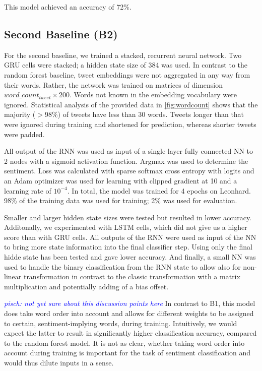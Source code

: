 \documentclass[10pt,conference,compsocconf]{IEEEtran}
\newcommand{\pisch}[1]{\textit{\textcolor{blue}{pisch: #1}}}
\begin{document}
This model achieved an accuracy of 72\%.

\subsection{Second Baseline (B2)} \label{b2}

For the second baseline, we trained a stacked, recurrent neural
network. Two GRU cells were stacked; a hidden state size of 384 was used.
In contrast to the random forest baseline, tweet embeddings
were not aggregated in any way from their words. Rather, the network
was trained on matrices of dimension \(word\_count_{tweet} \times 200\).
Words not known in the embedding vocabulary were ignored.
Statistical analysis of the provided data in \autoref{fig:wordcount} shows that
the majority ($>$98\%) of tweets have less than 30 words.
Tweets longer than that were ignored during training and shortened for prediction,
whereas shorter tweets were padded.

All output of the RNN was used as input of a single layer fully connected NN
to 2 nodes with a sigmoid activation function.
Argmax was used to determine the sentiment.
Loss was calculated with sparse softmax cross entropy with logits and
an Adam optimizer was used for learning with clipped gradient at 10
and a learning rate of $10^{-4}$.
In total, the model was trained for 4 epochs on Leonhard.
98\% of the training data was used for training; 2\% was used for evaluation.

Smaller and larger hidden state sizes were tested but resulted in
lower accuracy. Additonally, we experimented with LSTM cells, which did not give us
a higher score than with GRU cells.
All outputs of the RNN were used as input of the NN to bring more state
information into the final classifier step. Using only the final hidde
state has been tested and gave lower accuracy.
And finally, a small NN was used to handle the binary classification from the RNN 
state to allow also for non-linear transformation in contrast to the classic 
transformation with a matrix multiplication and potentially adding of a
bias offset.

\pisch{not yet sure about this discussion points here}
In contrast to B1, this model does take word order into account
and allows for different weights to be assigned to certain,
sentiment-implying words, during training. Intuitively, we would
expect the latter to result in significantly higher classification
accuracy, compared to the random forest model. It is not as clear,
whether taking word order into account during training is important
for the task of sentiment classification and would thus dilute inputs
in a sense.
\end{document}
